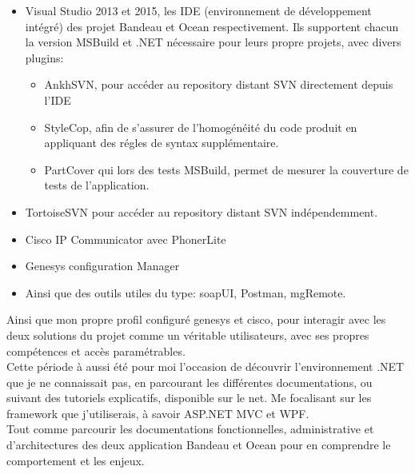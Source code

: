 \documentclass{rapport}
\begin{document}
\begin{itemize}
  \item Visual Studio 2013 et 2015, les IDE (environnement de développement intégré) des projet Bandeau et Ocean respectivement. Ils supportent chacun la version MSBuild et .NET nécessaire pour leurs propre projets, avec divers plugins:\\
  
    \begin{itemize}
        \item AnkhSVN, pour accéder au repository distant SVN directement depuis l'IDE\\
  
        \item StyleCop, afin de s'assurer de l'homogénéité du code produit en appliquant des régles de syntax supplémentaire.\\
  
        \item PartCover qui lors des tests MSBuild, permet de mesurer la couverture de tests de l'application.\\
    \end{itemize}

  \item TortoiseSVN pour accéder au repository distant SVN indépendemment.\\
  
  \item Cisco IP Communicator avec PhonerLite\\
  
  \item Genesys configuration Manager\\
  
  \item Ainsi que des outils utiles du type: soapUI, Postman, mgRemote.\\
  
\end{itemize}

Ainsi que mon propre profil configuré genesys et cisco, pour interagir avec les deux solutions du projet comme un véritable utilisateurs, avec ses propres compétences et accès paramétrables.\\

Cette période à aussi été pour moi l'occasion de découvrir l'environnement .NET que je ne connaissait pas, en parcourant les différentes documentations, ou suivant des tutoriels explicatifs, disponible sur le net. Me focalisant sur les framework que j'utiliserais, à savoir ASP.NET MVC et WPF.\\
Tout comme parcourir les documentations fonctionnelles, administrative et d'architectures des deux application Bandeau et Ocean pour en comprendre le comportement et les enjeux.\\
\end{document}
